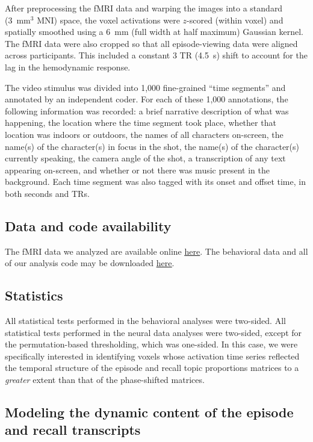 \documentclass[10pt]{article}
\begin{document}
After preprocessing the fMRI data and warping the images into a standard (3~mm$^3$ MNI) space, the voxel activations were $z$-scored (within voxel) and spatially smoothed using a 6~mm (full width at half maximum) Gaussian kernel.  The fMRI data were also cropped so that all episode-viewing data were aligned across participants.  This included a constant 3 TR (4.5~s) shift to account for the lag in the hemodynamic response.  \citep[All of these preprocessing steps followed][where additional details may be found.]{ChenEtal17}

The video stimulus was divided into 1,000 fine-grained ``time segments'' and annotated by an independent coder.  For each of these 1,000 annotations, the following information was recorded: a brief narrative description of what was happening, the location where the time segment took place, whether that location was indoors or outdoors, the names of all characters on-screen, the name(s) of the character(s) in focus in the shot, the name(s) of the character(s) currently speaking, the camera angle of the shot, a transcription of any text appearing on-screen, and whether or not there was music present in the background.  Each time segment was also tagged with its onset and offset time, in both seconds and TRs.

\subsection*{Data and code availability}
The fMRI data we analyzed are available online \href{http://dataspace.princeton.edu/jspui/handle/88435/dsp01nz8062179}{\underline{here}}.  The behavioral data and all of our analysis code may be downloaded \href{https://github.com/ContextLab/sherlock-topic-model-paper}{\underline{here}}.

\subsection*{Statistics}
All statistical tests performed in the behavioral analyses were two-sided.  All statistical tests performed in the neural data analyses were two-sided, except for the permutation-based thresholding, which was one-sided.  In this case, we were specifically interested in identifying voxels whose activation time series reflected the temporal structure of the episode and recall topic proportions matrices to a \textit{greater} extent than that of the phase-shifted matrices.

\subsection*{Modeling the dynamic content of the episode and recall transcripts}
\end{document}
